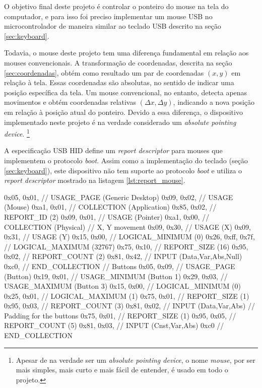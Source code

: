 \documentclass[brazil,pagestart=firstchapter]{abnt}
\begin{document}
O objetivo final deste projeto é controlar o ponteiro do mouse na tela do
computador, e para isso foi preciso implementar um mouse USB no
microcontrolador de maneira similar ao teclado USB descrito na seção
\ref{sec:keyboard}.

Todavia, o mouse deste projeto tem uma diferença fundamental em relação aos
mouses convencionais. A transformação de coordenadas, descrita na seção
\ref{sec:coordenadas}, obtém como resultado um par de coordenadas $(x, y)$
em relação à tela. Essas coordenadas são absolutas, no sentido de indicar
uma posição específica da tela. Um mouse convencional, no entanto, detecta
apenas movimentos e obtém coordenadas relativas $(\Delta x, \Delta y)$,
indicando a nova posição em relação à posição atual do ponteiro. Devido a
essa diferença, o dispositivo implementado neste projeto é na verdade
considerado um \textit{absolute pointing device}. \footnote{
	Apesar de na verdade ser um \textit{absolute pointing device}, o nome
	\textit{mouse}, por ser mais simples, mais curto e mais fácil de
	entender, é usado em todo o projeto.
}

A especificação \ac{USB} \ac{HID} define um \textit{report descriptor} para
mouses que implementem o protocolo \textit{boot}. \cite[p.~61]{usbhid} Assim
como a implementação do teclado (seção \ref{sec:keyboard}), este dispositivo
não tem suporte ao protocolo \textit{boot} e utiliza o \textit{report
descriptor} mostrado na listagem \ref{lst:report_mouse}.

\begin{ccode}[numbers=none, float=h, label={lst:report_mouse},
	caption={\textit{Report descriptor} do mouse USB}
]
	0x05, 0x01,        // USAGE_PAGE (Generic Desktop)
	0x09, 0x02,        // USAGE (Mouse)
	0xa1, 0x01,        // COLLECTION (Application)
	0x85, 0x02,	       //   REPORT_ID (2)
	0x09, 0x01,        //   USAGE (Pointer)
	0xa1, 0x00,        //   COLLECTION (Physical)
	// X, Y movement
	0x09, 0x30,        //     USAGE (X)
	0x09, 0x31,        //     USAGE (Y)
	0x15, 0x00,        //     LOGICAL_MINIMUM (0)
	0x26, 0xff, 0x7f,  //     LOGICAL_MAXIMUM (32767)
	0x75, 0x10,        //     REPORT_SIZE (16)
	0x95, 0x02,        //     REPORT_COUNT (2)
	0x81, 0x42,        //     INPUT (Data,Var,Abs,Null)
	0xc0,              //   END_COLLECTION
	// Buttons
	0x05, 0x09,        //   USAGE_PAGE (Button)
	0x19, 0x01,        //   USAGE_MINIMUM (Button 1)
	0x29, 0x03,        //   USAGE_MAXIMUM (Button 3)
	0x15, 0x00,        //   LOGICAL_MINIMUM (0)
	0x25, 0x01,        //   LOGICAL_MAXIMUM (1)
	0x75, 0x01,        //   REPORT_SIZE (1)
	0x95, 0x03,        //   REPORT_COUNT (3)
	0x81, 0x02,        //   INPUT (Data,Var,Abs)
	// Padding for the buttons
	0x75, 0x01,        //   REPORT_SIZE (1)
	0x95, 0x05,        //   REPORT_COUNT (5)
	0x81, 0x03,        //   INPUT (Cnst,Var,Abs)
	0xc0               // END_COLLECTION
\end{ccode}
\end{document}
